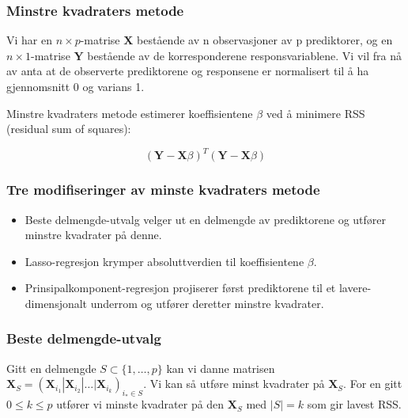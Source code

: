 \documentclass[aspectratio=169]{beamer}
\begin{document}
\begin{frame}
  \frametitle{Minstre kvadraters metode}

  Vi har en \(n\times p\)-matrise \(\textbf{X}\) bestående av n observasjoner av p prediktorer, og en \(n\times 1\)-matrise \(\textbf{Y}\) bestående av de korresponderene responsvariablene. Vi vil fra nå av anta at de observerte prediktorene og responsene er normalisert til å ha gjennomsnitt 0 og varians 1.

  \pause

  Minstre kvadraters metode estimerer koeffisientene \(\beta\) ved å minimere RSS (residual sum of squares):

  \begin{equation}
    (\textbf{Y} - \textbf{X}\beta)^T (\textbf{Y} - \textbf{X}\beta)
  \end{equation}
\end{frame}

\begin{frame}
  \frametitle{Tre modifiseringer av minste kvadraters metode}
  \begin{itemize}
    \item Beste delmengde-utvalg velger ut en delmengde av prediktorene og utfører minstre kvadrater på denne.
    \pause
  \item Lasso-regresjon krymper absoluttverdien til koeffisientene \(\beta\).
    \pause
    \item Prinsipalkomponent-regresjon projiserer først prediktorene til et lavere-dimensjonalt underrom og utfører deretter minstre kvadrater.
  \end{itemize}
\end{frame}

\begin{frame}
  \frametitle{Beste delmengde-utvalg}
  Gitt en delmengde \(S \subset \{1,\dots,p\}\) kan vi danne matrisen \(\textbf{X}_S = (\textbf{X}_{i_1}|\textbf{X}_{i_2}|\dots |\textbf{X}_{i_k})_{i_* \in S}\).
  Vi kan så utføre minst kvadrater på \(\textbf{X}_S\).
  \pause
  For en gitt \(0 \leq k \leq p\) utfører vi minste kvadrater på den \(\textbf{X}_S\) med \(|S| = k\) som gir lavest RSS.
\end{frame}
\end{document}
